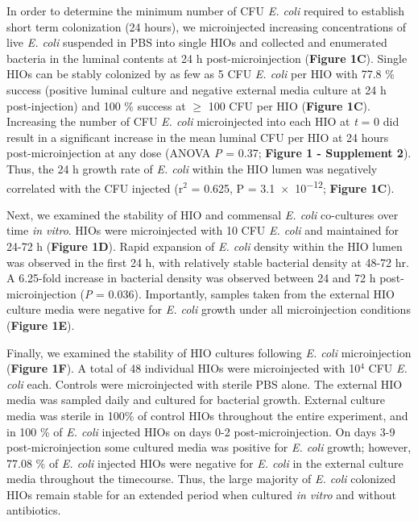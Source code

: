 \documentclass[9pt,lineo]{elife}
\begin{document}
In order to determine the minimum number of CFU \emph{E. coli} required to establish short term colonization (24 hours), we microinjected increasing concentrations of live \emph{E. coli} suspended in PBS into single HIOs and collected and enumerated bacteria in the luminal contents at 24 h post-microinjection (\textbf{Figure 1C}). Single HIOs can be stably colonized by as few as 5 CFU \emph{E. coli} per HIO with 77.8 \% success (positive luminal culture and negative external media culture at 24 h post-injection) and 100 \% success at \(\ge\) 100 CFU per HIO (\textbf{Figure 1C}).  Increasing the number of CFU \emph{E. coli} microinjected into each HIO at \emph{t} = 0 did result in a significant increase in the mean luminal CFU per HIO at 24 hours post-microinjection at any dose (ANOVA \emph{P} = 0.37; \textbf{Figure 1 - Supplement 2}). Thus, the 24 h growth rate of \emph{E. coli} within the HIO lumen was negatively correlated with the CFU injected (r\(^{\text{2}}\) = 0.625, P = \num{3.1e-12}; \textbf{Figure 1C}). 

Next, we examined the stability of HIO and commensal \emph{E. coli} co-cultures over time \emph{in vitro}. HIOs were microinjected with 10 CFU \emph{E. coli} and maintained for 24-72 h (\textbf{Figure 1D}). Rapid expansion of \emph{E. coli} density within the HIO lumen was observed in the first 24 h, with relatively stable bacterial density at 48-72 hr. A 6.25-fold increase in bacterial density was observed between 24 and 72 h post-microinjection (\emph{P} = 0.036). Importantly, samples taken from the external HIO culture media were negative for \emph{E. coli} growth under all microinjection conditions (\textbf{Figure 1E}).

Finally, we examined the stability of HIO cultures following \emph{E. coli} microinjection (\textbf{Figure 1F}). A total of 48 individual HIOs were microinjected with 10\(^{\text{4}}\) CFU \emph{E. coli} each. Controls were microinjected with sterile PBS alone. The external HIO media was sampled daily and cultured for bacterial growth. External culture media was sterile in 100\% of control HIOs throughout the entire experiment, and in 100 \% of \emph{E. coli} injected HIOs on days 0-2 post-microinjection. On days 3-9 post-microinjection some cultured media was positive for \emph{E. coli} growth; however, 77.08 \% of \emph{E. coli} injected HIOs were negative for \emph{E. coli} in the external culture media throughout the timecourse. Thus, the large majority of \emph{E. coli} colonized HIOs remain stable for an extended period when cultured \emph{in vitro} and without antibiotics.
\end{document}
